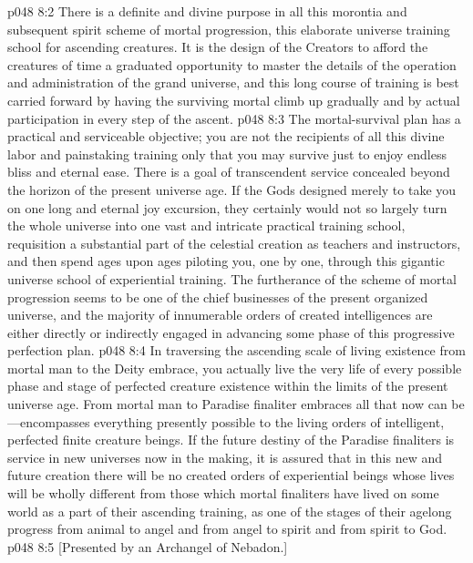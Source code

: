 \vs p048 8:2 There is a definite and divine purpose in all this morontia and subsequent spirit scheme of mortal progression, this elaborate universe training school for ascending creatures. It is the design of the Creators to afford the creatures of time a graduated opportunity to master the details of the operation and administration of the grand universe, and this long course of training is best carried forward by having the surviving mortal climb up gradually and by actual participation in every step of the ascent.
\vs p048 8:3 The mortal\hyp{}survival plan has a practical and serviceable objective; you are not the recipients of all this divine labor and painstaking training only that you may survive just to enjoy endless bliss and eternal ease. There is a goal of transcendent service concealed beyond the horizon of the present universe age. If the Gods designed merely to take you on one long and eternal joy excursion, they certainly would not so largely turn the whole universe into one vast and intricate practical training school, requisition a substantial part of the celestial creation as teachers and instructors, and then spend ages upon ages piloting you, one by one, through this gigantic universe school of experiential training. The furtherance of the scheme of mortal progression seems to be one of the chief businesses of the present organized universe, and the majority of innumerable orders of created intelligences are either directly or indirectly engaged in advancing some phase of this progressive perfection plan.
\vs p048 8:4 In traversing the ascending scale of living existence from mortal man to the Deity embrace, you actually live the very life of every possible phase and stage of perfected creature existence within the limits of the present universe age. From mortal man to Paradise finaliter embraces all that now can be---encompasses everything presently possible to the living orders of intelligent, perfected finite creature beings. If the future destiny of the Paradise finaliters is service in new universes now in the making, it is assured that in this new and future creation there will be no created orders of experiential beings whose lives will be wholly different from those which mortal finaliters have lived on some world as a part of their ascending training, as one of the stages of their agelong progress from animal to angel and from angel to spirit and from spirit to God.
\vsetoff
\vs p048 8:5 [Presented by an Archangel of Nebadon.]
